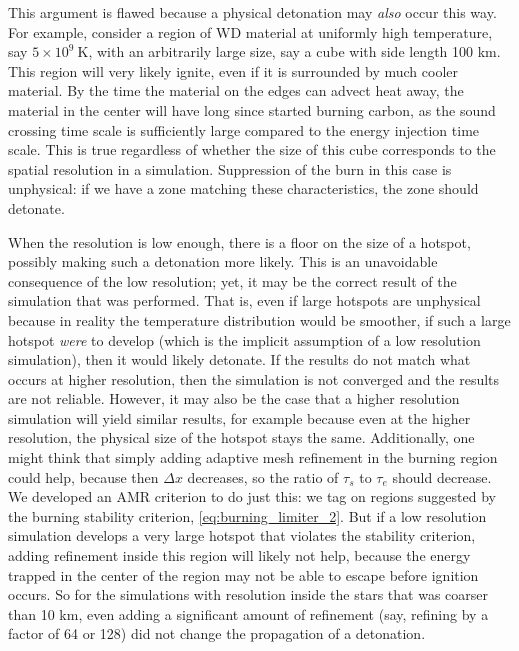 \documentclass[twocolumn,numberedappendix]{../aastex6}
\begin{document}
This argument is flawed because a physical detonation may \textit{also}
occur this way. For example, consider a region of WD material at uniformly
high temperature, say $5 \times 10^9\ \text{K}$, with an arbitrarily large size,
say a cube with side length 100 km. This region will very likely ignite,
even if it is surrounded by much cooler material. By the time the material on
the edges can advect heat away, the material in the center will have long since
started burning carbon, as the sound crossing time scale is sufficiently large
compared to the energy injection time scale. This is true regardless of whether
the size of this cube corresponds to the spatial resolution in a simulation.
Suppression of the burn in this case is unphysical: if we have a zone matching
these characteristics, the zone should detonate.

When the resolution is low enough, there is a floor on the size of a hotspot,
possibly making such a detonation more likely. This is an unavoidable consequence
of the low resolution; yet, it may be the correct result of the simulation that
was performed. That is, even if large hotspots are unphysical because in reality
the temperature distribution would be smoother, if such a large hotspot \textit{were}
to develop (which is the implicit assumption of a low resolution simulation), then
it would likely detonate. If the results do not match what occurs at higher
resolution, then the simulation is not converged and the results are not reliable.
However, it may also be the case that a higher resolution simulation will yield
similar results, for example because even at the higher resolution, the physical
size of the hotspot stays the same. Additionally, one might think that simply
adding adaptive mesh refinement in the burning region could help, because then
$\Delta x$ decreases, so the ratio of $\tau_s$ to $\tau_e$ should decrease.
We developed an AMR criterion to do just this: we tag on regions suggested by
the burning stability criterion, \autoref{eq:burning_limiter_2}. But if a low
resolution simulation develops a very large hotspot that violates the stability
criterion, adding refinement inside this region will likely not help, because the
energy trapped in the center of the region may not be able to escape before ignition
occurs. So for the simulations with resolution inside the stars that was coarser than
10 km, even adding a significant amount of refinement (say, refining by a factor of
64 or 128) did not change the propagation of a detonation.
\end{document}
